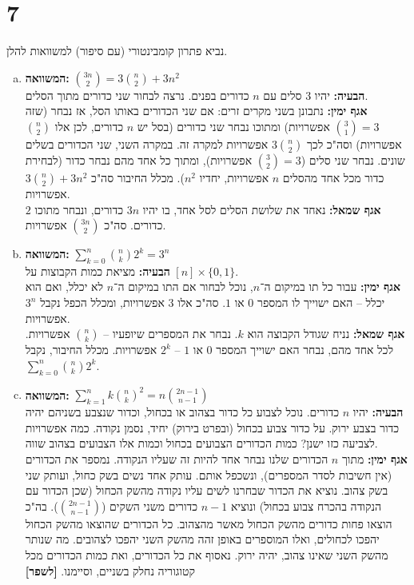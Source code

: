 \documentclass[]{article}
\begin{document}
	\section*{7} %
	נביא פתרון קומבינטורי (עם סיפור) למשוואות להלן. 
	\begin{enumerate}[(a)]
		\item \textbf{המשוואה: }$\binom{3n}{2} = 3\binom{n}{2}+ 3n^2$ \\
		\textbf{הבעיה: }יהיו $3$ סלים עם $n$ כדורים בפנים. נרצה לבחור שני כדורים מתוך הסלים.  \\
		\textbf{אגף ימין: }נתבונן בשני מקרים זרים: אם שני הכדורים באותו הסל, אז נבחר (שזה $\binom{3}{1} = 3$ אפשרויות) ומתוכו נבחר שני כדורים (בסל יש $n$ כדורים, לכן אלו $\binom{n}{2}$ אפשרויות) וסה"כ לכך $3\binom{n}{2}$ אפשרויות למקרה זה. במקרה השני, שני הכדורים בשלים שונים. נבחר שני סלים ($\binom{3}{2} = 3$ אפשרויות), ומתוך כל אחד מהם נבחר כדור (לבחירת כדור מכל אחד מהסלים $n$ אפשרויות, יחדיו $n^2$). מכלל החיבור סה"כ $3\binom{n}{2} + 3n^2$ אפשרויות. \\
		\textbf{אגף שמאל: }נאחד את שלושת הסלים לסל אחד, בו יהיו $3n$ כדורים, ונבחר מתוכו $2$ כדורים. סה"כ $\binom{3n}{2}$ אפשרויות. 
		\item \textbf{המשוואה: }$\sum_{k = 0}^{n}\binom{n}{k}2^k = 3^n$ \\
		\textbf{הבעיה: }מציאת כמות הקבוצות על $[n] \times \{0, 1\}$. \\
		\textbf{אגף ימין: }עבור כל תו במיקום ה־$n$, נוכל לבחור אם התו במיקום ה־$n$ לא יכלל, ואם הוא יכלל – האם ישוייך לו המספר $0$ או $1$. סה"כ אלו $3$ אפשרויות, ומכלל הכפל נקבל $3^n$ אפשרויות.  \\
		\textbf{אגף שמאל: }נניח שגודל הקבוצה הוא $k$. נבחר את המספרים שיופעיו – $\binom{n}{k}$ אפשרויות. לכל אחד מהם, נבחר האם ישוייך המספר $0$ או $1$ – $2^k$ אפשרויות. מכלל החיבור, נקבל $\sum_{k = 0}^{n}\binom{n}{k}2^k$. 
		\item \textbf{המשוואה: }$\sum_{k = 1}^{n}k\binom{n}{k}^2 = n\binom{2n - 1}{n - 1}$ \\
		\textbf{הבעיה: }יהיו $n$ כדורים. נוכל לצבוע כל כדור בצהוב או בכחול, וכדור שנצבע בשניהם יהיה כדור בצבע ירוק. על כדור צבוע בכחול (ובפרט בירוק) יחיד, נסמן נקודה. כמה אפשרויות לצביעה כזו ישנן? כמות הכדורים הצבועים בכחול וכמות אלו הצבועים בצהוב שווה.  \\
		\textbf{אגף ימין: }מתוך $n$ הכדורים שלנו נבחר אחד להיות זה שעליו הנקודה. נמספר את הכדורים (אין חשיבות לסדר המספרים), ונשכפל אותם. עותק אחד נשים בשק כחול, ועותק שני בשק צהוב. נוציא את הכדור שבחרנו לשים עליו נקודה מהשק הכחול (שכן הכדור עם הנקודה בהכרח צבוע בכחול) ונוציא $n - 1$ כדורים משני השקים ($\binom{2n - 1}{n - 1}$). בה"כ הוצאו פחות כדורים מהשק הכחול מאשר מהצהוב. כל הכדורים שהוצאו מהשק הכחול יהפכו לכחולים, ואלו המוספרים באופן זהה מהשק השני יהפכו לצהובים. מה שנותר מהשק השני שאינו צהוב, יהיה ירוק. נאסוף את כל הכדורים, ואת כמות הכדורים מכל קטוגוריה נחלק בשניים, וסיימנו. \textbf{[לשפר]}  \\

\end{enumerate}
\end{document}
